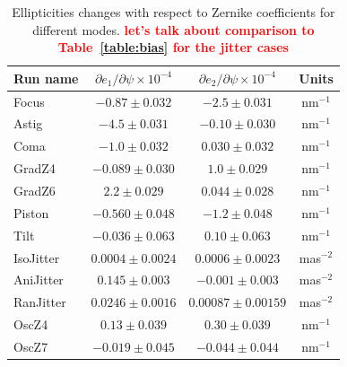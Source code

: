\documentclass[aps,prd, amsmath,amssymb,superscriptaddress,showkeys,nofootinbib,reprint,preprintnumbers]{revtex4-1}
\newcommand{\verify}[1]{\textcolor{red}{\textbf{{#1}}}}
\begin{document}
\begin{table}
\label{table:partials}
\caption{Ellipticities changes with respect to Zernike coefficients for different modes. \verify{let's talk about comparison to Table~\ref{table:bias} for the jitter cases}}\label{dpsi}
\begin{center}
\begin{tabular}{ lccc }
\hline
\hline
Run name & $\partial e_1/\partial\psi \times 10^{-4}$ & $\partial e_2/\partial\psi \times 10^{-4}$ & Units \\
\hline
Focus           & $-0.87  \pm 0.032$   & $-2.5  \pm 0.031$ & nm$^{-1}$ \\
Astig           & $-4.5   \pm 0.031$   & $-0.10 \pm 0.030$  & nm$^{-1}$ \\
Coma            & $-1.0   \pm 0.032$   & $0.030 \pm 0.032$  & nm$^{-1}$ \\
GradZ4          & $-0.089 \pm 0.030$   & $1.0   \pm 0.029$  & nm$^{-1}$ \\
GradZ6          & $2.2    \pm 0.029$   & $0.044 \pm 0.028$  & nm$^{-1}$ \\
Piston 		    & $-0.560  \pm 0.048$  & $-1.2  \pm 0.048$  & nm$^{-1}$ \\
Tilt 			& $-0.036 \pm 0.063$   & $0.10  \pm 0.063$  & nm$^{-1}$ \\ \hline
IsoJitter 		& $  0.0004 \pm 0.0024$     & $0.0006  \pm 0.0023$ & mas$^{-2}$ \\
AniJitter 		& $0.145   \pm 0.003$  & $-0.001 \pm 0.003$ & mas$^{-2}$ \\
RanJitter 	    & $0.0246  \pm 0.0016$  & $0.00087  \pm 0.00159$ & mas$^{-2}$ \\ \hline
OscZ4 		    & $0.13   \pm 0.039$   & $0.30  \pm 0.039$  & nm$^{-1}$ \\
OscZ7 		    & $-0.019 \pm 0.045$   & $-0.044\pm 0.044$   & nm$^{-1}$ \\
\hline
\hline
\end{tabular}
\end{center}
\end{table}
\end{document}
